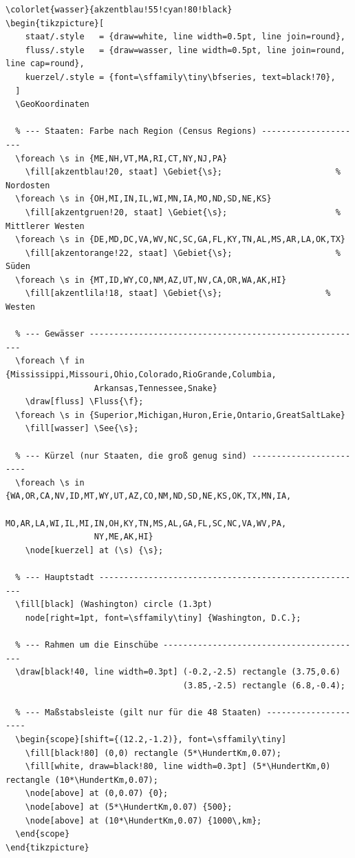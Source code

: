 \begin{lstlisting}[style=latex]
% Präambel: 
\colorlet{wasser}{akzentblau!55!cyan!80!black}
\begin{tikzpicture}[
    staat/.style   = {draw=white, line width=0.5pt, line join=round},
    fluss/.style   = {draw=wasser, line width=0.5pt, line join=round, line cap=round},
    kuerzel/.style = {font=\sffamily\tiny\bfseries, text=black!70},
  ]
  \GeoKoordinaten

  % --- Staaten: Farbe nach Region (Census Regions) ---------------------
  \foreach \s in {ME,NH,VT,MA,RI,CT,NY,NJ,PA}
    \fill[akzentblau!20, staat] \Gebiet{\s};                       % Nordosten
  \foreach \s in {OH,MI,IN,IL,WI,MN,IA,MO,ND,SD,NE,KS}
    \fill[akzentgruen!20, staat] \Gebiet{\s};                      % Mittlerer Westen
  \foreach \s in {DE,MD,DC,VA,WV,NC,SC,GA,FL,KY,TN,AL,MS,AR,LA,OK,TX}
    \fill[akzentorange!22, staat] \Gebiet{\s};                     % Süden
  \foreach \s in {MT,ID,WY,CO,NM,AZ,UT,NV,CA,OR,WA,AK,HI}
    \fill[akzentlila!18, staat] \Gebiet{\s};                     % Westen

  % --- Gewässer --------------------------------------------------------
  \foreach \f in {Mississippi,Missouri,Ohio,Colorado,RioGrande,Columbia,
                  Arkansas,Tennessee,Snake}
    \draw[fluss] \Fluss{\f};
  \foreach \s in {Superior,Michigan,Huron,Erie,Ontario,GreatSaltLake}
    \fill[wasser] \See{\s};

  % --- Kürzel (nur Staaten, die groß genug sind) ------------------------
  \foreach \s in {WA,OR,CA,NV,ID,MT,WY,UT,AZ,CO,NM,ND,SD,NE,KS,OK,TX,MN,IA,
                  MO,AR,LA,WI,IL,MI,IN,OH,KY,TN,MS,AL,GA,FL,SC,NC,VA,WV,PA,
                  NY,ME,AK,HI}
    \node[kuerzel] at (\s) {\s};

  % --- Hauptstadt ------------------------------------------------------
  \fill[black] (Washington) circle (1.3pt)
    node[right=1pt, font=\sffamily\tiny] {Washington, D.C.};

  % --- Rahmen um die Einschübe -----------------------------------------
  \draw[black!40, line width=0.3pt] (-0.2,-2.5) rectangle (3.75,0.6)
                                    (3.85,-2.5) rectangle (6.8,-0.4);

  % --- Maßstabsleiste (gilt nur für die 48 Staaten) ---------------------
  \begin{scope}[shift={(12.2,-1.2)}, font=\sffamily\tiny]
    \fill[black!80] (0,0) rectangle (5*\HundertKm,0.07);
    \fill[white, draw=black!80, line width=0.3pt] (5*\HundertKm,0) rectangle (10*\HundertKm,0.07);
    \node[above] at (0,0.07) {0};
    \node[above] at (5*\HundertKm,0.07) {500};
    \node[above] at (10*\HundertKm,0.07) {1000\,km};
  \end{scope}
\end{tikzpicture}
\end{lstlisting}

